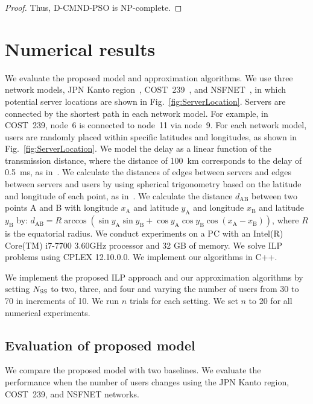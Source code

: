 \documentclass[10pt, letterpaper]{IEEEtran}
\begin{document}
\begin{CJK}{UTF8}{ipxm}
\begin{proof}
  Thus, D-CMND-PSO is NP-complete.
\end{proof}

\section{Numerical results}
\label{sec:numerical_results}
We evaluate the proposed model and approximation algorithms.
% 
We use three network models, JPN Kanto region~\cite{JPN}, COST~239~\cite{COST}, and NSFNET~\cite{NSFNET}, in which potential server locations are shown in Fig.~\ref{fig:ServerLocation}.
Servers are connected by the shortest path in each network model.
For example, in COST~239, node~6 is connected to node~11 via node~9.
For each network model, users are randomly placed within specific latitudes and longitudes, as shown in Fig.~\ref{fig:ServerLocation}.
We model the delay as a linear function of the transmission distance, where the distance of 100~km corresponds to the delay of 0.5~ms, as in~\cite{KawabataICC2023,CMND}.
We calculate the distances of edges between servers and edges between servers and users by using spherical trigonometry based on the latitude and longitude of each point, as in~\cite{12Imanaka2024}.
We calculate the distance $d_\mathrm{AB}$ between two points A and B with longitude $x_\mathrm{A}$ and latitude $y_\mathrm{A}$ and longitude $x_\mathrm{B}$ and latitude $y_\mathrm{B}$ by:
$d_\mathrm{AB} = R \arccos(\sin y_\mathrm{A} \sin y_\mathrm{B} + \cos y_\mathrm{A} \cos y_\mathrm{B} \cos(x_\mathrm{A} - x_\mathrm{B}))$,
where $R$ is the equatorial radius.
% 
We conduct experiments on a PC with an Intel(R) Core(TM) i7-7700 3.60GHz processor and 32 GB of memory.
We solve ILP problems using CPLEX 12.10.0.0\cite{CPLEX}.
We implement our algorithms in C++.

We implement the proposed ILP approach and our approximation algorithms by setting $N_{\rm{SS}}$ to two, three, and four and varying the number of users from 30 to 70 in increments of 10.
We run $n$ trials for each setting.
We set $n$ to 20 for all numerical experiments.

\subsection{Evaluation of proposed model}
We compare the proposed model with two baselines.
We evaluate the performance when the number of users changes using the JPN Kanto region, COST~239, and NSFNET networks.


\end{CJK}
\end{document}

